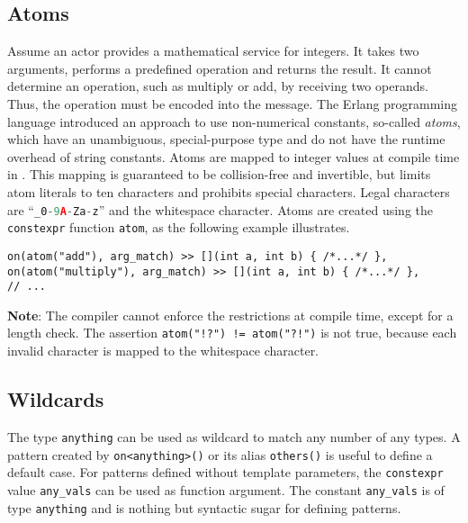 \subsection{Atoms}
\label{Sec::PatternMatching::Atoms}

Assume an actor provides a mathematical service for integers.
It takes two arguments, performs a predefined operation and returns the result.
It cannot determine an operation, such as multiply or add, by receiving two operands.
Thus, the operation must be encoded into the message.
The Erlang programming language introduced an approach to use non-numerical
constants, so-called \textit{atoms}, which have an unambiguous, special-purpose type and do not have the runtime overhead of string constants.
Atoms are mapped to integer values at compile time in \lib.
This mapping is guaranteed to be collision-free and invertible, but limits atom literals to ten characters and prohibits special characters.
Legal characters are ``\lstinline[language=C++]^_0-9A-Za-z^'' and the whitespace character.
Atoms are created using the \lstinline^constexpr^ function \lstinline^atom^, as the following example illustrates.

\begin{lstlisting}
on(atom("add"), arg_match) >> [](int a, int b) { /*...*/ },
on(atom("multiply"), arg_match) >> [](int a, int b) { /*...*/ },
// ...
\end{lstlisting}

\textbf{Note}: The compiler cannot enforce the restrictions at compile time, except for a length check.
The assertion \lstinline^atom("!?") != atom("?!")^ is not true, because each invalid character is mapped to the whitespace character.

\clearpage
\subsection{Wildcards}
\label{Sec::PatternMatching::Wildcards}

The type \lstinline^anything^ can be used as wildcard to match any number of any types.
A pattern created by \lstinline^on<anything>()^ or its alias \lstinline^others()^ is useful to define a default case.
For patterns defined without template parameters, the \lstinline^constexpr^ value \lstinline^any_vals^ can be used as function argument.
The constant \lstinline^any_vals^ is of type \lstinline^anything^ and is nothing but syntactic sugar for defining patterns.

